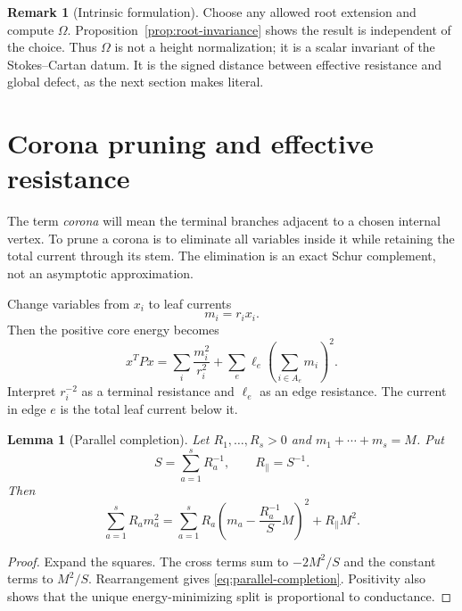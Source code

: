 \documentclass[11pt,a4paper]{amsart}
\theoremstyle{plain}
\newtheorem{lemma}[theorem]{Lemma}
\theoremstyle{definition}
\newtheorem{remark}[theorem]{Remark}
\begin{document}
\begin{remark}[Intrinsic formulation]
Choose any allowed root extension and compute $\Omega$.  Proposition~\ref{prop:root-invariance}
shows the result is independent of the choice.  Thus $\Omega$ is not a height normalization; it is
a scalar invariant of the Stokes--Cartan datum.  It is the signed distance between effective
resistance and global defect, as the next section makes literal.
\end{remark}

\section{Corona pruning and effective resistance}\label{sec:corona}

The term \emph{corona} will mean the terminal branches adjacent to a chosen internal vertex.  To
prune a corona is to eliminate all variables inside it while retaining the total current through
its stem.  The elimination is an exact Schur complement, not an asymptotic approximation.

Change variables from $x_i$ to leaf currents
\begin{equation}\label{eq:current-change}
                         m_i=r_ix_i.
\end{equation}
Then the positive core energy becomes
\begin{equation}\label{eq:electrical-energy}
 x^TPx=\sum_i\frac{m_i^2}{r_i^2}
       +\sum_e\ell_e\left(\sum_{i\in A_e}m_i\right)^2.
\end{equation}
Interpret $r_i^{-2}$ as a terminal resistance and $\ell_e$ as an edge resistance.  The current in
edge $e$ is the total leaf current below it.

\begin{lemma}[Parallel completion]\label{lem:parallel}
Let $R_1,\dots,R_s>0$ and $m_1+\cdots+m_s=M$.  Put
\[
 S=\sum_{a=1}^sR_a^{-1},\qquad R_{\parallel}=S^{-1}.
\]
Then
\begin{equation}\label{eq:parallel-completion}
 \sum_{a=1}^sR_am_a^2
 =\sum_{a=1}^sR_a\left(m_a-\frac{R_a^{-1}}{S}M\right)^2
  +R_{\parallel}M^2.
\end{equation}
\end{lemma}

\begin{proof}
Expand the squares.  The cross terms sum to $-2M^2/S$ and the constant terms to $M^2/S$.
Rearrangement gives \eqref{eq:parallel-completion}.  Positivity also shows that the unique
energy-minimizing split is proportional to conductance.
\end{proof}
\end{document}
